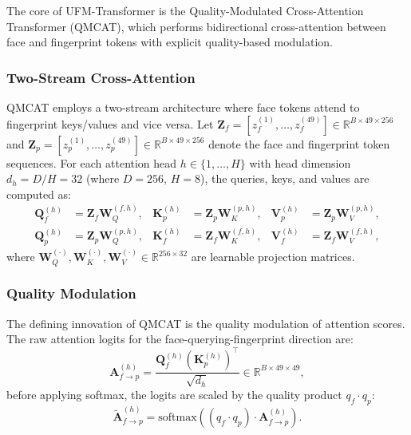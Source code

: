 \documentclass[10pt,journal,compsoc]{IEEEtran}
\begin{document}
The core of UFM-Transformer is the Quality-Modulated Cross-Attention Transformer (QMCAT), which performs bidirectional cross-attention between face and fingerprint tokens with explicit quality-based modulation.

\subsubsection{Two-Stream Cross-Attention}

QMCAT employs a two-stream architecture where face tokens attend to fingerprint keys/values and vice versa. Let $\mathbf{Z}_f = [z_f^{(1)}, \dots, z_f^{(49)}] \in \mathbb{R}^{B \times 49 \times 256}$ and $\mathbf{Z}_p = [z_p^{(1)}, \dots, z_p^{(49)}] \in \mathbb{R}^{B \times 49 \times 256}$ denote the face and fingerprint token sequences. For each attention head $h \in \{1, \dots, H\}$ with head dimension $d_h = D/H = 32$ (where $D=256$, $H=8$), the queries, keys, and values are computed as:
\begin{align}
\mathbf{Q}_f^{(h)} &= \mathbf{Z}_f \mathbf{W}_Q^{(f,h)}, & \mathbf{K}_p^{(h)} &= \mathbf{Z}_p \mathbf{W}_K^{(p,h)}, & \mathbf{V}_p^{(h)} &= \mathbf{Z}_p \mathbf{W}_V^{(p,h)}, \\
\mathbf{Q}_p^{(h)} &= \mathbf{Z}_p \mathbf{W}_Q^{(p,h)}, & \mathbf{K}_f^{(h)} &= \mathbf{Z}_f \mathbf{W}_K^{(f,h)}, & \mathbf{V}_f^{(h)} &= \mathbf{Z}_f \mathbf{W}_V^{(f,h)},
\end{align}
where $\mathbf{W}_Q^{(\cdot)}, \mathbf{W}_K^{(\cdot)}, \mathbf{W}_V^{(\cdot)} \in \mathbb{R}^{256 \times 32}$ are learnable projection matrices.

\subsubsection{Quality Modulation}

The defining innovation of QMCAT is the quality modulation of attention scores. The raw attention logits for the face-querying-fingerprint direction are:
\begin{equation}
\label{eq:attention_logits}
\mathbf{A}_{f \rightarrow p}^{(h)} = \frac{\mathbf{Q}_f^{(h)} (\mathbf{K}_p^{(h)})^{\top}}{\sqrt{d_h}} \in \mathbb{R}^{B \times 49 \times 49},
\end{equation}
before applying softmax, the logits are scaled by the quality product $q_f \cdot q_p$:
\begin{equation}
\label{eq:quality_modulation}
\tilde{\mathbf{A}}_{f \rightarrow p}^{(h)} = \text{softmax}\left( (q_f \cdot q_p) \cdot \mathbf{A}_{f \rightarrow p}^{(h)} \right).
\end{equation}
\end{document}
